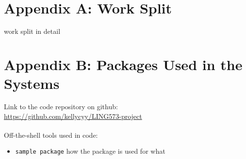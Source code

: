 \documentclass[11pt]{article}
\begin{document}





\appendix
\section*{Appendix A: Work Split}
\label{sec:appendix}
work split in detail

\appendix
\section*{Appendix B: Packages Used in the Systems}
\label{sec:appendix}
Link to the code repository on github: \\\url{https://github.com/kellycyy/LING573-project}\\\\
Off-the-shell tools used in code:

\begin{itemize}
\item \texttt{sample package} how the package is used for what
\end{itemize}
\end{document}
